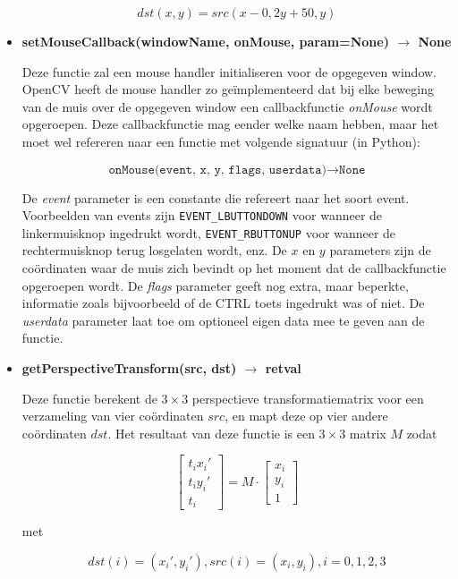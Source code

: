 \documentclass{article}
\begin{document}
\begin{itemize}
		 $$dst(x, y) = src(x - 0,2y + 50, y) $$
		 
		 
		 
		 
		 \item \textbf{setMouseCallback(windowName, onMouse, param=None) $\rightarrow$ None}
		 
		 Deze functie zal een mouse handler initialiseren voor de opgegeven window. OpenCV heeft de mouse handler zo geïmplementeerd dat bij elke beweging van de muis over de opgegeven window een callbackfunctie \textit{onMouse} wordt opgeroepen. Deze callbackfunctie mag eender welke naam hebben, maar het moet wel refereren naar een functie met volgende signatuur (in Python):
		 
		 $$\texttt{onMouse(event, x, y, flags, userdata)} \rightarrow \texttt{None}$$
		 
		 De \textit{event} parameter is een constante die refereert naar het soort event. Voorbeelden van events zijn \texttt{EVENT\_LBUTTONDOWN} voor wanneer de linkermuisknop ingedrukt wordt, \texttt{EVENT\_RBUTTONUP} voor wanneer de rechtermuisknop terug losgelaten wordt, enz. De $x$ en $y$ parameters zijn de coördinaten waar de muis zich bevindt op het moment dat de callbackfunctie opgeroepen wordt. De \textit{flags} parameter geeft nog extra, maar beperkte, informatie zoals bijvoorbeeld of de CTRL toets ingedrukt was of niet. De \textit{userdata} parameter laat toe om optioneel eigen data mee te geven aan de functie.
		 
		 

		 \item \textbf{getPerspectiveTransform(src, dst) $\rightarrow$ retval}
		 
		 Deze functie berekent de $3\times 3$ perspectieve transformatiematrix voor een verzameling van vier coördinaten $src$, en mapt deze op vier andere coördinaten $dst$. Het resultaat van deze functie is een $3 \times 3$ matrix $M$ zodat
		 
		 $$\begin{bmatrix}
		 t_ix_i' \\
		 t_iy_i' \\
		 t_i
		 \end{bmatrix} = M \cdot \begin{bmatrix}
		 x_i \\
		 y_i \\
		 1
		 \end{bmatrix} $$
		 
		 met
		 
		 $$dst(i) = (x_i', y_i'), src(i) = (x_i, y_i), i = 0, 1, 2, 3$$
		 

\end{itemize}
\end{document}
